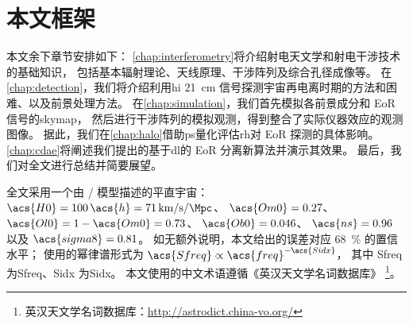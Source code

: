 \section{本文框架}
\label{sec:structure}

本文余下章节安排如下：
\autoref{chap:interferometry}将介绍射电天文学和射电干涉技术的基础知识，
包括基本辐射理论、天线原理、干涉阵列及综合孔径成像等。
在\autoref{chap:detection}，我们将介绍利用\acl{hi} \SI{21}{\cm}
信号探测宇宙再电离时期的方法和困难、以及前景处理方法。
在\autoref{chap:simulation}，我们首先模拟各前景成分和 EoR 信号的\acl{skymap}，
然后进行干涉阵列的模拟观测，得到整合了实际仪器效应的观测图像。
据此，我们在\autoref{chap:halo}借助\acl{ps}量化评估\acl{rh}对
EoR 探测的具体影响。
\autoref{chap:cdae}将阐述我们提出的基于\acl{dl}的 EoR 分离新算法并演示其效果。
最后，我们对全文进行总结并简要展望。

全文采用一个由 \lcdm/ 模型描述的平直宇宙：
$\acs{H0} = 100\,\acs{h} = \SI{71}{\km\per\second\per\Mpc}$、
$\acs{Om0} = 0.27$、
$\acs{Ol0} = 1 - \acs{Om0} = 0.73$、
$\acs{Ob0} = 0.046$、
$\acs{ns} = 0.96$ 以及 $\acs{sigma8} = 0.81$。
如无额外说明，本文给出的误差对应 \SI{68}{\percent} 的置信水平；
使用的幂律谱形式为 $\acs{Sfreq} \propto \acs{freq}^{-\acs{Sidx}}$，
其中 \acs{Sfreq} 为\acl{Sfreq}、\acs{Sidx} 为\acl{Sidx}。
本文使用的中文术语遵循《英汉天文学名词数据库》
\footnote{英汉天文学名词数据库：\url{http://astrodict.china-vo.org/}}。


